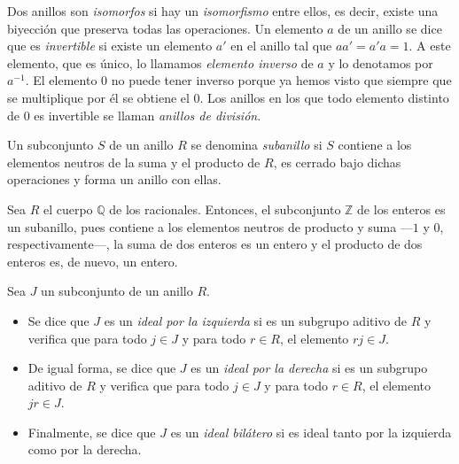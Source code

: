 Dos anillos son \textit{isomorfos} si hay un \textit{isomorfismo} entre ellos, es decir, existe una biyección que preserva todas las operaciones.
Un elemento \(a\) de un anillo se dice que es \textit{invertible} si existe un elemento \(a'\) en el anillo tal que \(aa' = a'a = 1\).
A este elemento, que es único, lo llamamos \textit{elemento inverso} de \(a\) y lo denotamos por \(a^{-1}\).
El elemento \(0\) no puede tener inverso porque ya hemos visto que siempre que se multiplique por él se obtiene el \(0\).
Los anillos en los que todo elemento distinto de 0 es invertible se llaman \textit{anillos de división}.



\begin{definition}
  Un subconjunto \(S\) de un anillo \(R\) se denomina \textit{subanillo} si \(S\) contiene a los elementos neutros de la suma y el producto de \(R\), es cerrado bajo dichas operaciones y forma un anillo con ellas.
\end{definition}

\begin{example}
  Sea \(R\) el cuerpo \(\mathbb Q\) de los racionales.
  Entonces, el subconjunto \(\mathbb Z\) de los enteros es un subanillo, pues contiene a los elementos neutros de producto y suma —\(1\) y \(0\), respectivamente—, la suma de dos enteros es un entero y el producto de dos enteros es, de nuevo, un entero.
  \label{ex:subanillo-racionales}
\end{example}

\begin{definition}
  Sea \(J\) un subconjunto de un anillo \(R\).
  \begin{itemize}
    \item Se dice que \(J\) es un \emph{ideal por la izquierda} si es un subgrupo aditivo de \(R\) y verifica que para todo \(j \in J\) y para todo \(r \in R\), el elemento \(rj \in J\).
    \item De igual forma, se dice que \(J\) es un \emph{ideal por la derecha} si es un subgrupo aditivo de \(R\) y verifica que para todo \(j \in J\) y para todo \(r \in R\), el elemento \(jr \in J\).
    \item Finalmente, se dice que \(J\) es un \emph{ideal bilátero} si es ideal tanto por la izquierda como por la derecha.
  \end{itemize}
\end{definition}

